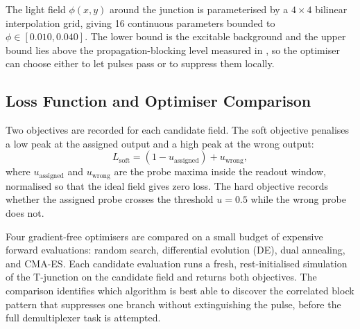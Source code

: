 The light field $\phi(x,y)$ around the junction is parameterised by a $4 \times 4$ bilinear interpolation grid, giving 16 continuous parameters bounded to $\phi \in [0.010, 0.040]$.
The lower bound is the excitable background and the upper bound lies above the propagation-blocking level measured in , so the optimiser can choose either to let pulses pass or to suppress them locally.

\subsection{Loss Function and Optimiser Comparison}
\label{sec:meth_demux_loss}

Two objectives are recorded for each candidate field.
The soft objective penalises a low peak at the assigned output and a high peak at the wrong output:
\begin{equation}
L_{\mathrm{soft}} = (1 - u_{\mathrm{assigned}}) + u_{\mathrm{wrong}},
\label{eq:tjunc_soft_loss}
\end{equation}
where $u_{\mathrm{assigned}}$ and $u_{\mathrm{wrong}}$ are the probe maxima inside the readout window, normalised so that the ideal field gives zero loss.
The hard objective records whether the assigned probe crosses the threshold $u = 0.5$ while the wrong probe does not.

Four gradient-free optimisers are compared on a small budget of expensive forward evaluations: random search, differential evolution (DE), dual annealing, and CMA-ES.
Each candidate evaluation runs a fresh, rest-initialised simulation of the T-junction on the candidate field and returns both objectives.
The comparison identifies which algorithm is best able to discover the correlated block pattern that suppresses one branch without extinguishing the pulse, before the full demultiplexer task is attempted.
